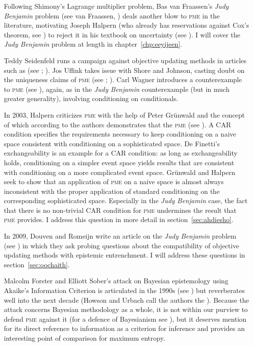 \documentclass[phd,12pt,oneside]{ubcthesis}
\begin{document}
Following Shimony's Lagrange multiplier problem, Bas van Fraassen's
\emph{Judy Benjamin} problem (see van Fraassen,
) deals another blow to \textsc{pme} in the
literature, motivating Joseph Halpern (who already has reservations
against Cox's theorem, see ) to reject it in his
textbook on uncertainty (see ). I will cover the
\emph{Judy Benjamin} problem at length in chapter~\ref{chp:eeyijeen}.

Teddy Seidenfeld runs a campaign against objective updating methods in
articles such as  (see
; ). Jos Uffink
takes issue with Shore and Johnson, casting doubt on the uniqueness
claims of \textsc{pme} (see ;
). Carl Wagner introduces a counterexample to
\textsc{pme} (see ), again, as in the \emph{Judy
  Benjamin} counterexample (but in much greater generality), involving
conditioning on conditionals.

In 2003, Halpern criticizes \textsc{pme} with the help of Peter
Gr{\"u}nwald and the concept of  which
according to the authors demonstrates that the \textsc{pme}
 (see
). A CAR condition specifies the
requirements necessary to keep conditioning on a naive space
consistent with conditioning on a sophisticated space. De Finetti's
exchangeability is an example for a CAR condition: as long as
exchangeability holds, conditioning on a simpler event space yields
results that are consistent with conditioning on a more complicated
event space. Gr{\"u}nwald and Halpern seek to show that an application
of \textsc{pme} on a naive space is almost always inconsistent with
the proper application of standard conditioning on the corresponding
sophisticated space. Especially in the \emph{Judy Benjamin} case, the
fact that there is no non-trivial CAR condition for \textsc{pme}
undermines the result that \textsc{pme} provides. I address this
question in more detail in section~\ref{sec:ahdiesho}.

In 2009, Douven and Romeijn write an article on the \emph{Judy
  Benjamin} problem (see ) in which they
ask probing questions about the compatibility of objective updating
methods with epistemic entrenchment. I will address these questions in
section~\ref{sec:oochaith}.

Malcolm Forster and Elliott Sober's attack on Bayesian epistemology
using Akai\-ke's Information Criterion is articulated in the 1990s (see
) but reverberates well into the next
decade (Howson and Urbach call the authors the ). Because the attack concerns Bayesian methodology as a
whole, it is not within our purview to defend \textsc{pme} against
it (for a defence of Bayesianism see
), but it deserves mention for its
direct reference to information as a criterion for inference and
provides an interesting point of comparison for maximum entropy.
\end{document}
